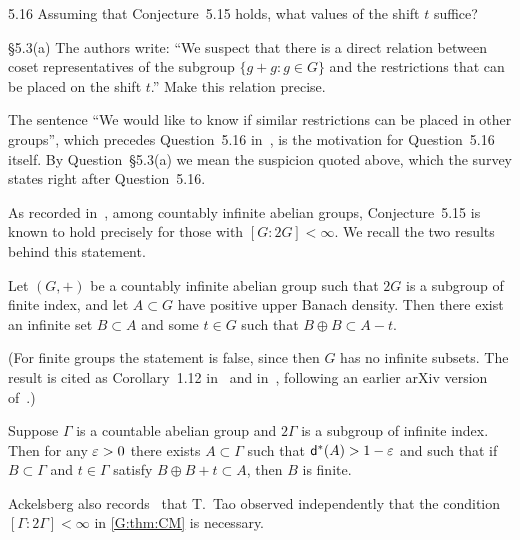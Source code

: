 \begin{question}{5.16}\label{G:q:516}
Assuming that Conjecture~5.15 holds, what values of the shift $t$ suffice?
\end{question}

\begin{question}{\S5.3(a)}\label{G:q:53a}
The authors write: ``We suspect that there is a direct relation between coset
representatives of the subgroup $\{g+g:g\in G\}$ and the restrictions that can be placed
on the shift $t$.'' Make this relation precise.
\end{question}

The sentence ``We would like to know if similar restrictions can be placed in other
groups'', which precedes Question~5.16 in~\cite{kra2023problems}, is the motivation for
Question~5.16 itself. By Question~\S5.3(a) we mean the suspicion quoted above, which the
survey states right after Question~5.16.

As recorded in~\cite{kra2023problems}, among countably infinite abelian groups,
Conjecture~5.15 is known to hold precisely for those with $[G:2G]<\infty$. We recall the two results behind this statement.

\begin{theorem}
\label{G:thm:CM}
Let $(G,+)$ be a countably infinite abelian group such that $2G$ is a subgroup of finite index, and
let $A\subset G$ have positive upper Banach density. Then there exist an infinite set
$B\subset A$ and some $t\in G$ such that $B\oplus B\subset A-t$.
\end{theorem}

(For finite groups the statement is false, since then $G$ has no infinite subsets. The result is cited as Corollary~1.12 in~\cite{kra2023problems}
and in~\cite[Theorem~1.1]{ackelsberg2024counterexamples}, following an earlier arXiv
version of~\cite{charamaras2024finding}.)

\begin{theorem}
\label{G:thm:Ack}
Suppose $\Gamma$ is a countable abelian group and $2\Gamma$ is a subgroup of infinite
index. Then for any $\varepsilon>0$ there exists $A\subset\Gamma$ such that $\mathsf{d}^*(A)>1-\varepsilon$
and such that if $B\subset\Gamma$ and $t\in\Gamma$ satisfy $B\oplus B+t\subset A$, then
$B$ is finite.
\end{theorem}

Ackelsberg also records~\cite[footnote~2]{ackelsberg2024counterexamples} that T.~Tao
observed independently that the condition $[\Gamma:2\Gamma]<\infty$ in \cref{G:thm:CM}
is necessary.

